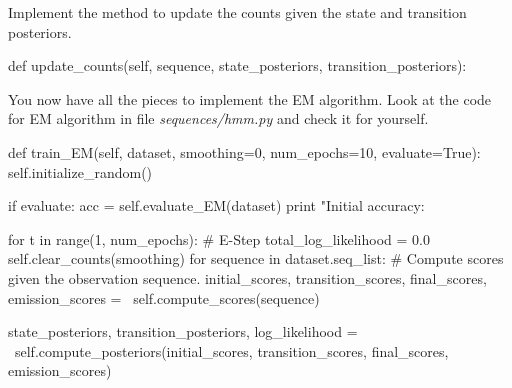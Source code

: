 \begin{exercise}

Implement the method to update the counts given the state and transition posteriors.
\begin{python}
 def update_counts(self, sequence, state_posteriors, transition_posteriors):
\end{python}




You now have all the pieces to implement the
EM algorithm. Look at the code for EM algorithm in file
\emph{sequences/hmm.py} and check it for yourself. 

\begin{python}
    def train_EM(self, dataset, smoothing=0, num_epochs=10, evaluate=True):
        self.initialize_random()

        if evaluate:
            acc = self.evaluate_EM(dataset)
            print "Initial accuracy: %
            
        for t in range(1, num_epochs):
            # E-Step
            total_log_likelihood = 0.0
            self.clear_counts(smoothing)
            for sequence in dataset.seq_list:
                # Compute scores given the observation sequence.
                initial_scores, transition_scores, final_scores, emission_scores = \
                    self.compute_scores(sequence)
                
                state_posteriors, transition_posteriors, log_likelihood = \
                    self.compute_posteriors(initial_scores,
                                            transition_scores,
                                            final_scores,
                                            emission_scores)


\end{python}
\end{exercise}
